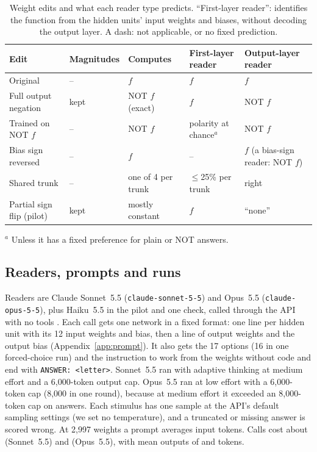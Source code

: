 \documentclass[10pt]{article}
\newcommand{\Sonnet}{Sonnet~5.5}
\newcommand{\Opus}{Opus~5.5}
\newcommand{\Haiku}{Haiku~5.5}
\begin{document}
\begin{table}[t]
\centering\small
\caption{Weight edits and what each reader type predicts. ``First-layer reader'': identifies the function from the hidden units' input weights and biases, without decoding the output layer. A dash: not applicable, or no fixed prediction.}
\label{tab:edits}
\begin{tabular}{@{}lllll@{}}
\toprule
Edit & Magnitudes & Computes & First-layer reader & Output-layer reader \\
\midrule
Original & -- & $f$ & $f$ & $f$ \\
Full output negation & kept & NOT $f$ (exact) & $f$ & NOT $f$ \\
Trained on NOT $f$ & -- & NOT $f$ & polarity at chance$^a$ & NOT $f$ \\
Bias sign reversed & -- & $f$ & -- & $f$ (a bias-sign reader: NOT $f$) \\
Shared trunk & -- & one of 4 per trunk & $\le$25\% per trunk & right \\
Partial sign flip (pilot) & kept & mostly constant & $f$ & ``none'' \\
\bottomrule
\end{tabular}

\smallskip
\raggedright\footnotesize $^a$ Unless it has a fixed preference for plain or NOT answers.
\end{table}

\subsection{Readers, prompts and runs}
Readers are Claude \Sonnet{} (\texttt{claude-sonnet-5-5}) and \Opus{} (\texttt{claude-opus-5-5}), plus \Haiku{} in the pilot and one check, called through the API with no tools \citep{anthropic2026models}. Each call gets one network in a fixed format: one line per hidden unit with its 12 input weights and bias, then a line of output weights and the output bias (Appendix~\ref{app:prompt}). It also gets the 17 options (16 in one forced-choice run) and the instruction to work from the weights without code and end with \texttt{ANSWER: <letter>}.
\Sonnet{} ran with adaptive thinking at medium effort and a 6,000-token output cap. \Opus{} ran at low effort with a 6,000-token cap (8,000 in one round), because at medium effort it exceeded an 8,000-token cap on \nOpusMedTrunc{} answers. Each stimulus has one sample at the API's default sampling settings (we set no temperature), and a truncated or missing answer is scored wrong. At 2,997 weights a prompt averages \nMeanIn{} input tokens. Calls cost about \nSonCallCost{} (\Sonnet) and \nOpusCallCost{} (\Opus), with mean outputs of \nSonMeanOut{} and \nOpusMeanOut{} tokens.
\end{document}
